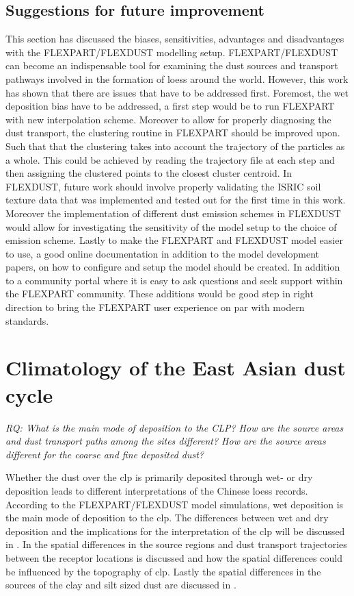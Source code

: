 \subsection{Suggestions for future improvement}\label{sec:conclusion_improvement}
This section has discussed the biases, sensitivities, advantages and disadvantages with the FLEXPART/FLEXDUST modelling setup. 
FLEXPART/FLEXDUST can become an indispensable tool for examining the dust sources and transport pathways involved in the formation of loess around the world. 
However, this work has shown that there are issues that have to be addressed first. 
Foremost, the wet deposition bias have to be addressed, a first step would be to run FLEXPART with new interpolation scheme. 
Moreover to allow for properly diagnosing the dust transport, the clustering routine in FLEXPART should be improved upon. Such that that the clustering takes into account the trajectory of the particles as a whole. 
This could be achieved by reading the trajectory file at each step and then assigning the clustered points to the closest cluster centroid. 
In FLEXDUST, future work should involve properly validating the ISRIC soil texture data that was implemented and tested out for the first time in this work. 
Moreover the implementation of different dust emission schemes in FLEXDUST would allow for investigating the sensitivity of the model setup to the choice of emission scheme. 
Lastly to make the FLEXPART and FLEXDUST model easier to use, a good online documentation in addition to the model development papers, on how to configure and setup the model should be created. 
In addition to a community portal where it is easy to ask questions and seek support within the FLEXPART community. 
These additions would be good step in right direction to bring the FLEXPART user experience on par with modern standards.

\section{Climatology of the East Asian dust cycle}

\emph{RQ: What is the main mode of deposition to the CLP? How are the source areas and dust transport paths among the sites different? How are the source areas different for the coarse and fine deposited dust?}

Whether the dust over the \acrshort{clp} is primarily deposited through wet- or dry deposition leads to different interpretations of the Chinese loess records.  
According to the FLEXPART/FLEXDUST model simulations, wet deposition is the main mode of deposition to the \acrshort{clp}. 
The differences between wet and dry deposition and the implications for the interpretation of the \acrshort{clp} will be discussed in . 
In  the spatial differences in the source regions and dust transport trajectories between the receptor locations is discussed and how the spatial differences could be influenced by the topography of \acrshort{clp}. 
Lastly the spatial differences in the sources of the clay and silt sized dust are discussed in .

